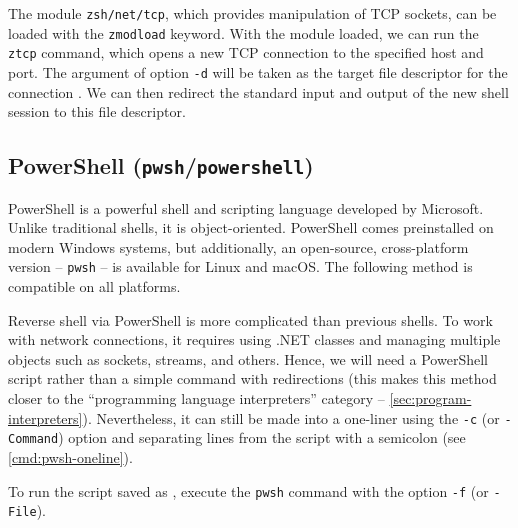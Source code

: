 The module \texttt{zsh/net/tcp}, which provides manipulation of TCP sockets, can be loaded with the \texttt{zmodload} keyword. With the module loaded, we can run the \texttt{ztcp} command, which opens a new TCP connection to the specified host and port. The argument of option \texttt{-d} will be taken as the target file descriptor for the connection \cite{zsh-net-tcp-doc}. We can then redirect the standard input and output of the new shell session to this file descriptor.



\subsection{PowerShell (\texttt{pwsh}/\texttt{powershell})}


PowerShell is a powerful shell and scripting language developed by Microsoft. Unlike traditional shells, it is object-oriented. PowerShell comes preinstalled on modern Windows systems, but additionally, an open-source, cross-platform version -- \texttt{pwsh} -- is available for Linux and macOS. The following method is compatible on all platforms.

Reverse shell via PowerShell is more complicated than previous shells. To work with network connections, it requires using .NET classes and managing multiple objects such as sockets, streams, and others. Hence, we will need a PowerShell script rather than a simple command with redirections (this makes this method closer to the ``programming language interpreters'' category -- \cref{sec:program-interpreters}). Nevertheless, it can still be made into a one-liner using the \texttt{-c} (or \texttt{-Command}) option and separating lines from the script with a semicolon (see \cref{cmd:pwsh-oneline}).


To run the script saved as \scriptfile , execute the \texttt{pwsh} command with the option \texttt{-f} (or \texttt{-File}).



